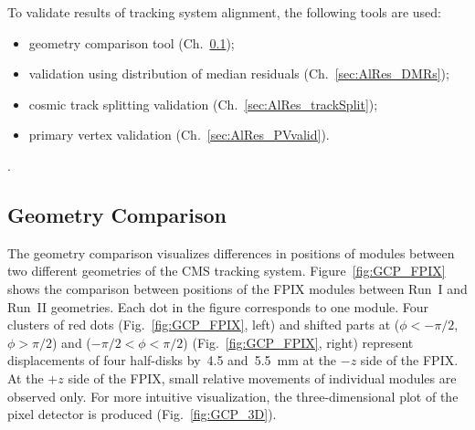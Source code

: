 To validate results of tracking system alignment, the following tools are used:
\begin{itemize}
  \item geometry comparison tool (Ch.~\ref{sec:AlRes_GCP});
  \item validation using distribution of median residuals (Ch.~\ref{sec:AlRes_DMRs});
  \item cosmic track splitting validation (Ch.~\ref{sec:AlRes_trackSplit});
  \item primary vertex validation (Ch.~\ref{sec:AlRes_PVvalid}). 
\end{itemize}
.

\subsection{Geometry Comparison}
\label{sec:AlRes_GCP}

The geometry comparison visualizes differences in positions of modules between two different geometries of the CMS tracking system. Figure~\ref{fig:GCP_FPIX} shows the comparison between positions of the FPIX modules between Run~I and Run~II geometries. Each dot in the figure corresponds to one module. Four clusters of red dots (Fig.~\ref{fig:GCP_FPIX}, left) and shifted parts at ($\phi<-\pi/2$, $\phi>\pi/2$) and ($-\pi/2<\phi<\pi/2$) (Fig.~\ref{fig:GCP_FPIX}, right) represent displacements of four half-disks by~4.5 and~5.5~mm at the $-z$ side of the FPIX. At the $+z$ side of the FPIX, small relative movements of individual modules are observed only. For more intuitive visualization, the three-dimensional plot of the pixel detector is produced (Fig.~\ref{fig:GCP_3D}).     

